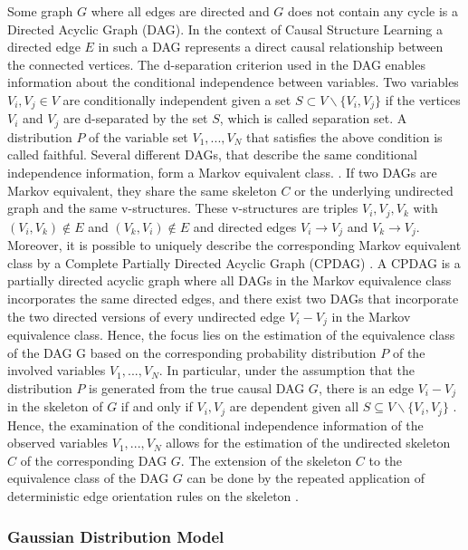 Some graph $G$ where all edges are directed and $G$ does not contain any cycle is a Directed Acyclic Graph (DAG). In the context of Causal Structure Learning a directed edge $E$ in such a DAG represents a direct causal relationship between the connected vertices.
The d-separation criterion used in the DAG enables information about the conditional independence between variables. Two variables $V_i, V_j \in V$ are conditionally independent given a set $S \subset V \backslash \{V_i, V_j\}$ if the vertices $V_i$ and $V_j$ are d-separated by the set $S$, which is called separation set.
A distribution $P$ of the variable set $V_1, ..., V_N$ that satisfies the above condition is called faithful.
Several different DAGs, that describe the same conditional independence information, form a Markov equivalent class. \cite{andersson_characterization_1997}. If two DAGs are Markov equivalent, they share the same skeleton $C$ or the underlying undirected graph and the same v-structures.
These v-structures are triples $V_i,V_j,V_k$ with $(V_i,V_k) \notin E$ and $(V_k,V_i) \notin E$ and directed edges $V_i \rightarrow V_j$ and $V_k \rightarrow V_j$. Moreover, it is possible to uniquely describe the corresponding Markov equivalent class by a Complete Partially Directed Acyclic Graph (CPDAG) \cite{chickering_optimal_2003}.
A CPDAG is a partially directed acyclic graph where all DAGs in the Markov equivalence class incorporates the same directed edges, and there exist two DAGs that incorporate the two directed versions of every undirected edge $V_i - V_j$ in the Markov equivalence class.
Hence, the focus lies on the estimation of the equivalence class of the DAG G based on the corresponding probability distribution $P$ of the involved variables $V_1,...,V_N$. In particular, under the assumption that the distribution $P$ is generated from the true causal DAG $G$, there is an edge $V_i - V_j$ in the skeleton of $G$ if and only if $V_i,V_j$ are dependent given all $S \subseteq V\backslash \{V_i,V_j\}$ \cite{spirtes_causation_1993}.
Hence, the examination of the conditional independence information of the observed variables $V_1,...,V_N$ allows for the estimation of the undirected skeleton $C$ of the corresponding DAG $G$. The extension of the skeleton $C$ to the equivalence class of the DAG $G$ can be done by the repeated application of deterministic edge orientation rules on the skeleton \cite{colombo_order-independent_nodate,kalisch_estimating_2007,pearl_introduction_2010}.

\subsubsection{Gaussian Distribution Model}


